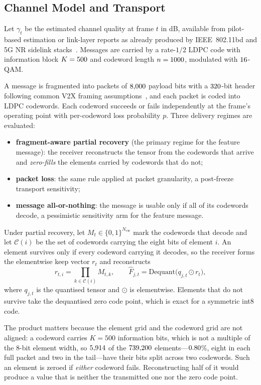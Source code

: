 \documentclass[journal]{IEEEtran}
\begin{document}
\subsection{Channel Model and Transport}\label{sec:channel}
Let $\gamma_t$ be the estimated channel quality at frame $t$ in dB, available from pilot-based
estimation or link-layer reports as already produced by IEEE~802.11bd and 5G NR sidelink
stacks~\cite{ieee80211bd}. Messages are carried by a rate-$1/2$ LDPC code with information block
$K = 500$ and codeword length $n = 1000$, modulated with $16$-QAM.

A message is fragmented into packets of $8{,}000$ payload bits with a $320$-bit header
following common V2X framing assumptions~\cite{ieee80211bd,3gpp37885}, and each packet is coded into
LDPC codewords. Each codeword succeeds or fails independently at the frame's operating point with
per-codeword loss probability $p$. Three delivery regimes are evaluated:

\begin{itemize}
\item \textbf{fragment-aware partial recovery} (the primary regime for the feature message): the
receiver reconstructs the tensor from the codewords that arrive and \emph{zero-fills} the elements
carried by codewords that do not;
\item \textbf{packet loss}: the same rule applied at packet granularity, a post-freeze transport
sensitivity;
\item \textbf{message all-or-nothing}: the message is usable only if all of its codewords decode, a
pessimistic sensitivity arm for the feature message.
\end{itemize}

Under partial recovery, let $M_t \in \{0,1\}^{N_{\mathrm{cw}}}$ mark the codewords that decode and
let $\mathcal{C}(i)$ be the set of codewords carrying the eight bits of element $i$. An element
survives only if every codeword carrying it decodes, so the receiver forms the elementwise keep
vector $r_t$ and reconstructs
\begin{equation}
r_{t,i} = \prod_{k \in \mathcal{C}(i)} M_{t,k}, \qquad
\hat F_{j,t} = \mathrm{Dequant}\bigl(q_{j,t} \odot r_t\bigr),
\label{eq:recon}
\end{equation}
where $q_{j,t}$ is the quantised tensor and $\odot$ is elementwise. Elements that do not survive
take the dequantised zero code point, which is exact for a symmetric int8 code.

The product matters because the element grid and the codeword grid are not aligned: a codeword
carries $K=500$ information bits, which is not a multiple of the $8$-bit element width, so
$5{,}914$ of the $739{,}200$ elements---$0.80$\%, eight in each full packet and two
in the tail---have their bits split across two codewords. Such an element is zeroed if
\emph{either} codeword fails. Reconstructing half of it would produce a value that is neither the
transmitted one nor the zero code point.
\end{document}
